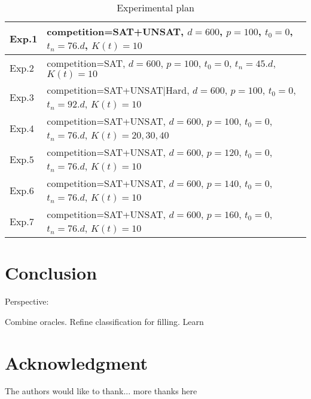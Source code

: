\documentclass[10pt, conference, compsocconf]{IEEEtran}
\begin{document}
\begin{table}
  \begin{center}
  \begin{tabular}{ p{1cm} | p{6cm} }

    {\small Exp.1} & {\small competition=SAT+UNSAT, $d=600$, $p=100$, $t_0 = 0$, $t_n = 76.d$, $K(t) = 10$} \\\hline
    {\small Exp.2} & {\small competition=SAT, $d=600$, $p=100$, $t_0 = 0$, $t_n = 45.d$, $K(t) = 10$} \\\hline
    {\small Exp.3} & {\small competition=SAT+UNSAT|Hard, $d=600$, $p=100$, $t_0 = 0$, $t_n = 92.d$, $K(t) = 10$} \\\hline
    {\small Exp.4} & {\small competition=SAT+UNSAT, $d=600$, $p=100$, $t_0 = 0$, $t_n = 76.d$, $K(t) = 20, 30, 40$} \\\hline
    {\small Exp.5} & {\small competition=SAT+UNSAT, $d=600$, $p=120$, $t_0 = 0$, $t_n = 76.d$, $K(t) = 10$} \\\hline
    {\small Exp.6} & {\small competition=SAT+UNSAT, $d=600$, $p=140$, $t_0 = 0$, $t_n = 76.d$, $K(t) = 10$} \\\hline
    {\small Exp.7} & {\small competition=SAT+UNSAT, $d=600$, $p=160$, $t_0 = 0$, $t_n = 76.d$, $K(t) = 10$} \\
  \end{tabular}
  \caption{Experimental plan}
  \label{tab:plan}
  \end{center} 
\end{table}

\section{Conclusion} \label{Conclusion}


Perspective: 

Combine oracles. Refine classification for filling. Learn 



\section*{Acknowledgment}


The authors would like to thank...
more thanks here








\end{document}
